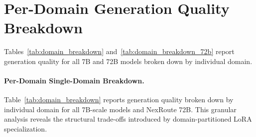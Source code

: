\documentclass[a4paper,fleql,doubleblind]{cas-sc}
\begin{document}
\section{Per-Domain Generation Quality Breakdown}
\label{supp:domain_breakdown}

Tables~\ref{tab:domain_breakdown} and~\ref{tab:domain_breakdown_72b} report
generation quality for all 7B and 72B models broken down by individual domain.

\paragraph{Per-Domain Single-Domain Breakdown.}
Table~\ref{tab:domain_breakdown} reports generation quality broken down by
individual domain for all 7B-scale models and NexRoute 72B. This granular
analysis reveals the structural trade-offs introduced by domain-partitioned
LoRA specialization.

\newpage
\vspace{6pt plus 4pt minus 3pt}
\end{document}
